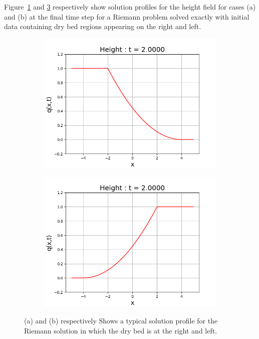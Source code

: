 \documentclass[11pt,a4paper]{article}
\begin{document}
	
	Figure~\ref{fig:right} and \ref{fig:left} respectively show solution profiles for the height field for cases (a) and (b) at the final time step for a Riemann problem  solved exactly with initial data containing dry bed regions appearing on the right and left.
	\begin{figure}[H]
		\begin{subfigure}[b]{0.5\textwidth}
			\centering
			\includegraphics[width=1.0\linewidth]{images/right}
			\caption{}
			\label{fig:right}
		\end{subfigure}
		\begin{subfigure}[b]{0.5\textwidth}
			\centering
			\includegraphics[width=1.0\linewidth]{images/left}
			\caption{}
			\label{fig:left}
		\end{subfigure}
		\caption{(a) and (b) respectively Shows a typical solution profile for the Riemann solution in which the dry bed is at the right and left. }
	\end{figure}
\end{document}

